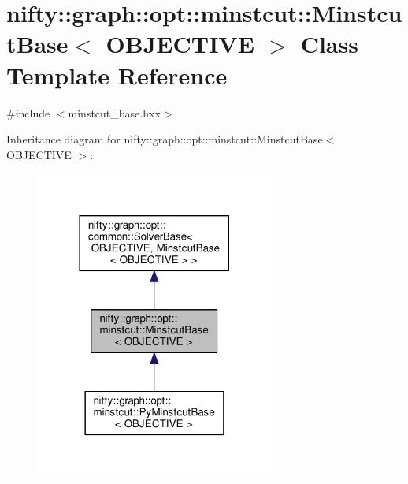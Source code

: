 \hypertarget{classnifty_1_1graph_1_1opt_1_1minstcut_1_1MinstcutBase}{}\section{nifty\+:\+:graph\+:\+:opt\+:\+:minstcut\+:\+:Minstcut\+Base$<$ O\+B\+J\+E\+C\+T\+I\+VE $>$ Class Template Reference}
\label{classnifty_1_1graph_1_1opt_1_1minstcut_1_1MinstcutBase}


{\ttfamily \#include $<$minstcut\+\_\+base.\+hxx$>$}



Inheritance diagram for nifty\+:\+:graph\+:\+:opt\+:\+:minstcut\+:\+:Minstcut\+Base$<$ O\+B\+J\+E\+C\+T\+I\+VE $>$\+:
\nopagebreak
\begin{figure}[H]
\begin{center}
\leavevmode
\includegraphics[width=222pt]{classnifty_1_1graph_1_1opt_1_1minstcut_1_1MinstcutBase__inherit__graph}
\end{center}
\end{figure}


